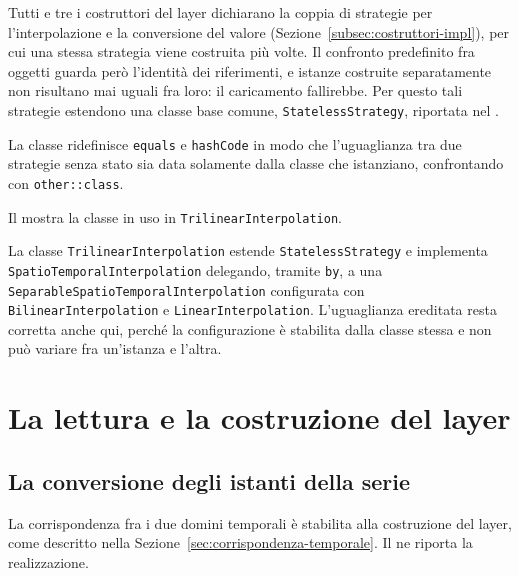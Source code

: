 Tutti e tre i costruttori del layer dichiarano la coppia di strategie per l'interpolazione
e la conversione del valore (Sezione~\ref{subsec:costruttori-impl}), per cui una stessa
strategia viene costruita più volte. Il confronto predefinito fra oggetti guarda però
l'identità dei riferimenti, e istanze costruite separatamente non risultano mai uguali fra
loro: il caricamento fallirebbe. Per questo tali strategie estendono una classe base comune,
\texttt{StatelessStrategy}, riportata nel .



La classe ridefinisce \texttt{equals} e \texttt{hashCode} in modo che l'uguaglianza
tra due strategie senza stato sia data solamente dalla classe che istanziano, confrontando
con \texttt{other::class}.

Il  mostra la classe in uso in \texttt{TrilinearInterpolation}.



La classe \texttt{TrilinearInterpolation} estende \texttt{StatelessStrategy} e implementa
\texttt{SpatioTemporalInterpolation} delegando, tramite \texttt{by}, a una
\texttt{SeparableSpatioTemporalInterpolation} configurata con
\texttt{BilinearInterpolation} e \texttt{LinearInterpolation}. L'uguaglianza
ereditata resta corretta anche qui, perché la configurazione è stabilita dalla classe stessa
e non può variare fra un'istanza e l'altra.

\section{La lettura e la costruzione del layer}
\label{sec:layer-impl}

\subsection{La conversione degli istanti della serie}
\label{subsec:corrispondenza-impl}

La corrispondenza fra i due domini temporali è stabilita alla costruzione del layer, come
descritto nella Sezione~\ref{sec:corrispondenza-temporale}. Il  ne
riporta la realizzazione.

